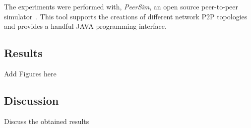 
The experiments were performed with, \textit{PeerSim}, an open source peer-to-peer simulator~\cite{p2p09-peersim}. This tool supports the creations of different network P2P topologies and provides a handful JAVA programming interface.



%
%

\subsection{Results}

Add Figures here

\subsection{Discussion}

Discuss the obtained results